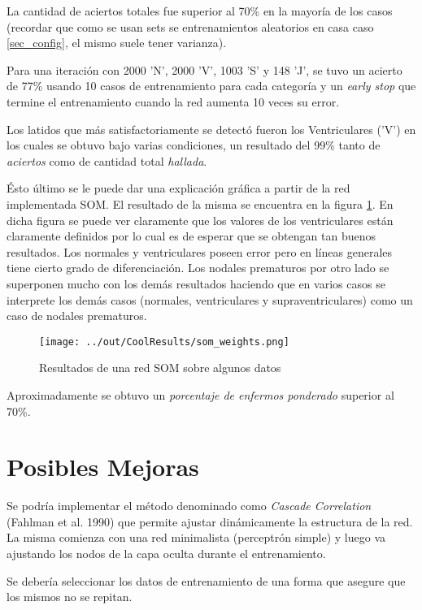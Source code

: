 \documentclass[conference]{IEEEtran}
\theoremstyle{definition}
\begin{document}
La cantidad de aciertos totales fue superior al 70\% en la mayoría de los casos (recordar que como se usan sets se entrenamientos aleatorios en casa caso \ref{sec_config}, el mismo suele tener varianza).

Para una iteración con 2000 'N', 2000 'V', 1003 'S' y 148 'J', se tuvo un acierto de 77\% usando 10 casos de entrenamiento para cada categoría y un \textit{early stop} que termine el entrenamiento cuando la red aumenta 10 veces su error.

Los latidos que más satisfactoriamente se detectó fueron los Ventriculares ('V') en los cuales se obtuvo bajo varias condiciones, un resultado del 99\% tanto de \textit{aciertos} como de cantidad total \textit{hallada}.

Ésto último se le puede dar una explicación gráfica a partir de la red implementada SOM. El resultado de la misma se encuentra en la figura \ref{fig_som}. En dicha figura se puede ver claramente que los valores de los ventriculares están claramente definidos por lo cual es de esperar que se obtengan tan buenos resultados. Los normales y ventriculares poseen error pero en líneas generales tiene cierto grado de diferenciación. Los nodales prematuros por otro lado se superponen mucho con los demás resultados haciendo que en varios casos se interprete los demás casos (normales, ventriculares y supraventriculares) como un caso de nodales prematuros.

\begin{figure}[H]
	\centering
	\texttt{[image: ../out/CoolResults/som\_weights.png]}
	\caption{Resultados de una red SOM sobre algunos datos}
	\label{fig_som}
\end{figure}

Aproximadamente se obtuvo un \textit{porcentaje de enfermos ponderado} superior al 70\%.

\section{Posibles Mejoras}

Se podría implementar el método denominado como \textit{Cascade Correlation} (Fahlman et al. 1990) que permite ajustar dinámicamente la estructura de la red. La misma comienza con una red minimalista (perceptrón simple) y luego va ajustando los nodos de la capa oculta durante el entrenamiento.

Se debería seleccionar los datos de entrenamiento de una forma que asegure que los mismos no se repitan.
\end{document}
